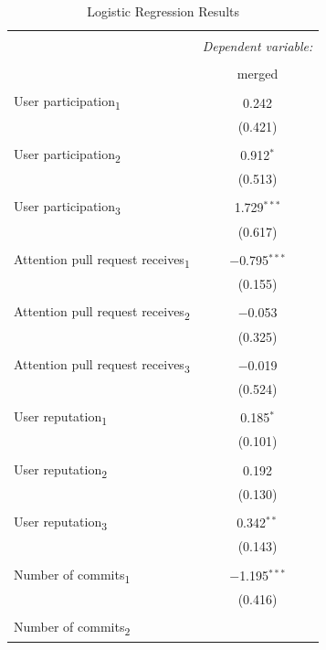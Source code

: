 \documentclass[12pt]{article}
\begin{document}
\begin{table}[!htbp] \tiny \centering 
\caption{Logistic Regression Results} 
\label{logit} 
\begin{tabular}{@{\extracolsep{5pt}}lc} 
\\[-1.8ex]\hline 
\hline \\[-1.8ex] 
& \multicolumn{1}{c}{\textit{Dependent variable:}} \\ 
\cline{2-2} 
\\[-1.8ex] & merged \\ 
\hline \\[-1.8ex] 
User participation\textsubscript{1} & 0.242 \\ 
& (0.421) \\ 
& \\ 
User participation\textsubscript{2} & 0.912$^{*}$ \\ 
& (0.513) \\ 
& \\ 
User participation\textsubscript{3} & 1.729$^{***}$ \\ 
& (0.617) \\ 
& \\ 
Attention pull request receives\textsubscript{1} & $-$0.795$^{***}$
\\ 
& (0.155) \\ 
& \\ 
Attention pull request receives\textsubscript{2} & $-$0.053 \\ 
& (0.325) \\ 
& \\ 
Attention pull request receives\textsubscript{3} & $-$0.019
\\ 
& (0.524) \\ 
& \\ 
User reputation\textsubscript{1} & 0.185$^{*}$
\\ 
& (0.101) \\ 
& \\ 
User reputation\textsubscript{2} &
0.192 \\ 
& (0.130) \\ 
& \\ 
User reputation\textsubscript{3}
& 0.342$^{**}$ \\ 
& (0.143) \\ 
& \\ 
Number of commits\textsubscript{1}
& $-$1.195$^{***}$ \\ 
& (0.416) \\ 
& \\ 
Number of commits\textsubscript{2}

\end{tabular}
\end{table}
\end{document}

